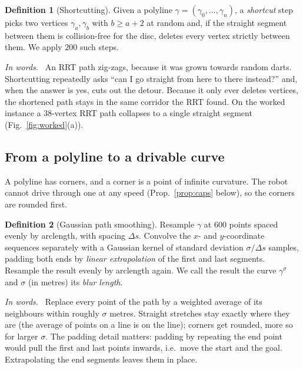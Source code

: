 \documentclass[conference]{IEEEtran}
\theoremstyle{plain}
\theoremstyle{definition}
\newtheorem{definition}{Definition}
\newcommand{\inwords}{\par\smallskip\noindent\textit{In words.}\ }
\begin{document}
\begin{definition}[Shortcutting]
\label{def:shortcut}
Given a polyline $\gamma = (\gamma_0,\dots,\gamma_n)$, a \emph{shortcut} step picks two
vertices $\gamma_a, \gamma_b$ with $b \ge a+2$ at random and, if the straight segment between
them is collision-free for the disc, deletes every vertex strictly between them. We apply
$200$ such steps.
\inwords
An RRT path zig-zags, because it was grown towards random darts. Shortcutting repeatedly
asks ``can I go straight from here to there instead?'' and, when the answer is yes, cuts
out the detour. Because it only ever deletes vertices, the shortened path stays in the same
corridor the RRT found. On the worked instance a $38$-vertex RRT path collapses to a single
straight segment (Fig.~\ref{fig:worked}(a)).
\end{definition}

\subsection{From a polyline to a drivable curve}
\label{sec:prelim-smooth}

A polyline has corners, and a corner is a point of infinite curvature. The robot cannot
drive through one at any speed (Prop.~\ref{prop:caps} below), so the corners are rounded
first.

\begin{definition}[Gaussian path smoothing]
\label{def:blur}
Resample $\gamma$ at $600$ points spaced evenly by arclength, with spacing $\Delta s$.
Convolve the $x$- and $y$-coordinate sequences separately with a Gaussian kernel of standard
deviation $\sigma/\Delta s$ samples, padding both ends by \emph{linear extrapolation} of the
first and last segments. Resample the result evenly by arclength again. We call the result
the curve $\gamma^{\sigma}$ and $\sigma$ (in metres) its \emph{blur length}.
\inwords
Replace every point of the path by a weighted average of its neighbours within roughly
$\sigma$ metres. Straight stretches stay exactly where they are (the average of points on a
line is on the line); corners get rounded, more so for larger $\sigma$. The padding detail
matters: padding by repeating the end point would pull the first and last points inwards,
i.e.\ move the start and the goal. Extrapolating the end segments leaves them in place.
\end{definition}
\end{document}
